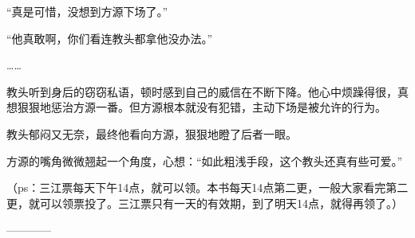 \begin{this_body}
“真是可惜，没想到方源下场了。”

“他真敢啊，你们看连教头都拿他没办法。”

……

教头听到身后的窃窃私语，顿时感到自己的威信在不断下降。他心中烦躁得很，真想狠狠地惩治方源一番。但方源根本就没有犯错，主动下场是被允许的行为。

教头郁闷又无奈，最终他看向方源，狠狠地瞪了后者一眼。

方源的嘴角微微翘起一个角度，心想：“如此粗浅手段，这个教头还真有些可爱。”

（ps：三江票每天下午14点，就可以领。本书每天14点第二更，一般大家看完第二更，就可以领票投了。三江票只有一天的有效期，到了明天14点，就得再领了。）

------------

\end{this_body}

